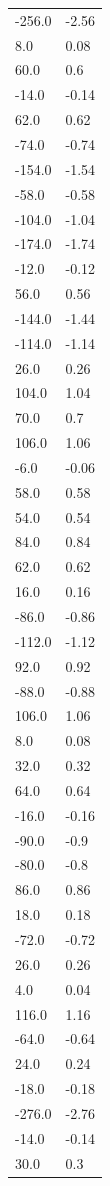 \begin{longtable}{ll}
-256.0 & -2.56 \\
8.0 & 0.08 \\
60.0 & 0.6 \\
-14.0 & -0.14 \\
62.0 & 0.62 \\
-74.0 & -0.74 \\
-154.0 & -1.54 \\
-58.0 & -0.58 \\
-104.0 & -1.04 \\
-174.0 & -1.74 \\
-12.0 & -0.12 \\
56.0 & 0.56 \\
-144.0 & -1.44 \\
-114.0 & -1.14 \\
26.0 & 0.26 \\
104.0 & 1.04 \\
70.0 & 0.7 \\
106.0 & 1.06 \\
-6.0 & -0.06 \\
58.0 & 0.58 \\
54.0 & 0.54 \\
84.0 & 0.84 \\
62.0 & 0.62 \\
16.0 & 0.16 \\
-86.0 & -0.86 \\
-112.0 & -1.12 \\
92.0 & 0.92 \\
-88.0 & -0.88 \\
106.0 & 1.06 \\
8.0 & 0.08 \\
32.0 & 0.32 \\
64.0 & 0.64 \\
-16.0 & -0.16 \\
-90.0 & -0.9 \\
-80.0 & -0.8 \\
86.0 & 0.86 \\
18.0 & 0.18 \\
-72.0 & -0.72 \\
26.0 & 0.26 \\
4.0 & 0.04 \\
116.0 & 1.16 \\
-64.0 & -0.64 \\
24.0 & 0.24 \\
-18.0 & -0.18 \\
-276.0 & -2.76 \\
-14.0 & -0.14 \\
30.0 & 0.3 \\

\end{longtable}
